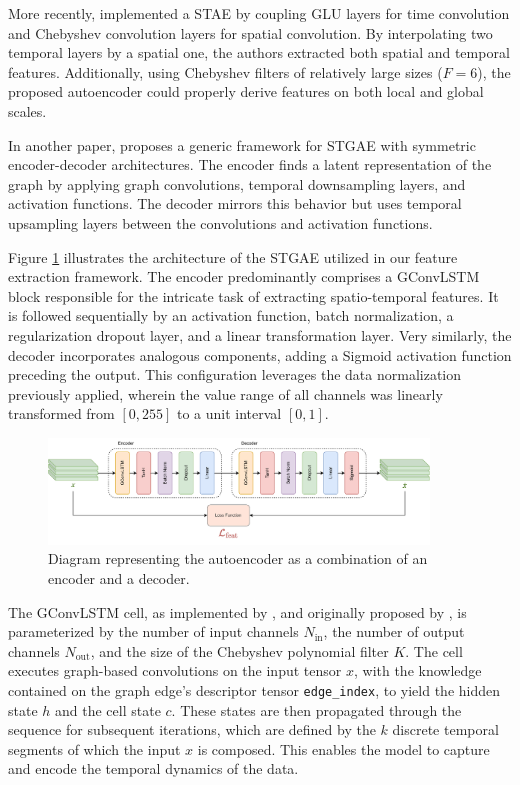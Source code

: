 More recently, \cite{fan2023spatiotemporal} implemented a \gls{STAE} by coupling \gls{GLU} layers for time convolution and Chebyshev convolution layers for spatial convolution. By interpolating two temporal layers by a spatial one, the authors extracted both spatial and temporal features. Additionally, using Chebyshev filters of relatively large sizes ($F=6$), the proposed autoencoder could properly derive features on both local and global scales.

In another paper, \cite{sabbaqi2022graph} proposes a generic framework for \gls{STGAE} with symmetric encoder-decoder architectures. The encoder finds a latent representation of the graph by applying graph convolutions, temporal downsampling layers, and activation functions. The decoder mirrors this behavior but uses temporal upsampling layers between the convolutions and activation functions. 
 
Figure \ref{fig:autoencoder} illustrates the architecture of the \gls{STGAE} utilized in our feature extraction framework. The encoder predominantly comprises a \gls{GConvLSTM} block responsible for the intricate task of extracting spatio-temporal features. It is followed sequentially by an activation function, batch normalization, a regularization dropout layer, and a  linear transformation layer. Very similarly, the decoder incorporates analogous components, adding a Sigmoid activation function preceding the output. This configuration leverages the data normalization previously applied, wherein the value range of all channels was linearly transformed from $[0, 255]$ to a unit interval $[0, 1]$.

\begin{figure}[!ht]
\noindent\hspace{0.5mm}\includegraphics[width=0.9\textwidth]{./figures/Autoencoder.pdf}
\caption{Diagram representing the autoencoder as a combination of an encoder and a decoder.}
\label{fig:autoencoder}
\end{figure}

The \gls{GConvLSTM} cell, as implemented by \cite{rozemberczki2021pytorch}, and originally proposed by \cite{Seo_2018}, is parameterized by the number of input channels $N_{\text{in}}$, the number of output channels $N_{\text{out}}$, and the size of the Chebyshev polynomial filter $K$. The cell executes graph-based convolutions on the input tensor $x$, with the knowledge contained on the graph edge's descriptor tensor \texttt{edge\_index}, to yield the hidden state $h$ and the cell state $c$. These states are then propagated through the sequence for subsequent iterations, which are defined by the $k$ discrete temporal segments of which the input $x$ is composed. This enables the model to capture and encode the temporal dynamics of the data.

